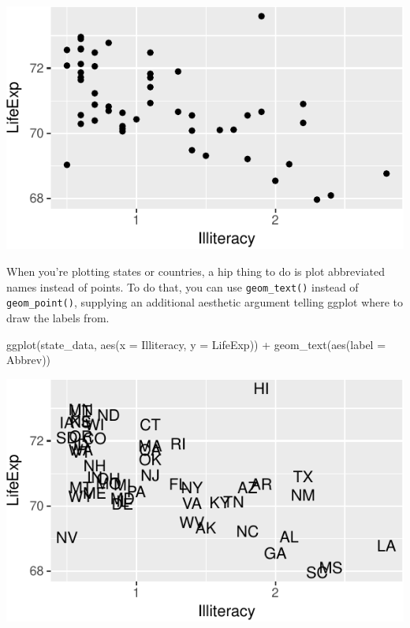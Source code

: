 \documentclass[
  12pt,
  oneside,openany]{book}
\newenvironment{Shaded}{\begin{snugshade}}{\end{snugshade}}
\newcommand{\AttributeTok}[1]{\textcolor[rgb]{0.77,0.63,0.00}{#1}}
\newcommand{\FunctionTok}[1]{\textcolor[rgb]{0.00,0.00,0.00}{#1}}
\newcommand{\NormalTok}[1]{#1}
\newcommand{\SpecialCharTok}[1]{\textcolor[rgb]{0.00,0.00,0.00}{#1}}
\begin{document}
\includegraphics{pdaps_files/figure-latex/scatter-1.pdf}

When you're plotting states or countries, a hip thing to do is plot abbreviated names instead of points. To do that, you can use \texttt{geom\_text()} instead of \texttt{geom\_point()}, supplying an additional aesthetic argument telling ggplot where to draw the labels from.

\begin{Shaded}
\begin{Highlighting}[]
\FunctionTok{ggplot}\NormalTok{(state\_data, }\FunctionTok{aes}\NormalTok{(}\AttributeTok{x =}\NormalTok{ Illiteracy, }\AttributeTok{y =}\NormalTok{ LifeExp)) }\SpecialCharTok{+}
  \FunctionTok{geom\_text}\NormalTok{(}\FunctionTok{aes}\NormalTok{(}\AttributeTok{label =}\NormalTok{ Abbrev))}
\end{Highlighting}
\end{Shaded}

\includegraphics{pdaps_files/figure-latex/scatter-text-1.pdf}
\end{document}
